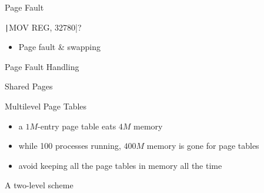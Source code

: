 \begin{frame}[fragile]{Page Fault}
  \begin{minipage}{.44\textwidth}
    \centering
  \end{minipage}\hfill
  \begin{minipage}{.4\textwidth}
    \texttt|MOV REG, 32780|?
    \begin{itemize}
    \item[\Symbol{➠}] Page fault \& swapping
    \end{itemize}
  \end{minipage}
\end{frame}

\begin{frame}{Page Fault Handling}
  \centering
  \mode<beamer>{ \texttt{[image: osc-9-14]} }%
\end{frame}


\begin{frame}{Shared Pages}
  \centering
  \mode<beamer>{ \texttt{[image: osc-8-33]} }%
\end{frame}

\begin{frame}{Multilevel Page Tables}
  \begin{itemize}
  \item a $1M$-entry page table eats $4M$ memory
  \item while 100 processes running, $400M$ memory is gone for page tables
  \item avoid keeping all the page tables in memory all the time
  \end{itemize}
  \begin{iblock}{A two-level scheme}
    \begin{center}
    \end{center}
  \end{iblock}
\end{frame}

